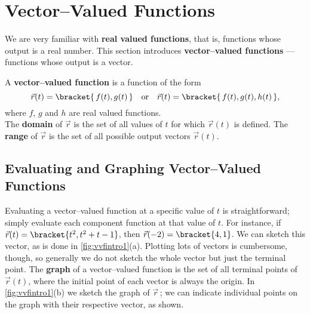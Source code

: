 \section{Vector--Valued Functions}\label{sec:vvf}


We are very familiar with \textbf{real valued functions}, that is, functions whose output is a real number. This section introduces \textbf{vector--valued functions} --- functions whose output is a vector. 

{A \textbf{vector--valued function} is a function of the form 
$$\vec r(t) =\bracket{\, f(t),g(t)\,}\quad \text{or}\quad \vec r(t) =\bracket{\,f(t),g(t),h(t)\,},$$
where $f$, $g$ and $h$ are real valued functions.\\

The \textbf{domain} of $\vec r$ is the set of all values of $t$ for which $\vec r(t)$ is defined. The \textbf{range} of $\vec r$ is the set of all possible output vectors $\vec r(t)$.
}

\subsection*{Evaluating and Graphing Vector--Valued Functions}

Evaluating a vector--valued function at a specific value of $t$ is straightforward; simply evaluate each component function at that value of $t$. For instance, if $\vec r(t) =\bracket{t^2,t^2+t-1}$, then $\vec r(-2) =\bracket{4,1}$. We can sketch this vector, as is done in \autoref{fig:vvfintro1}(a). Plotting lots of vectors is cumbersome, though, so generally we do not sketch the whole vector but just the terminal point. The \textbf{graph} of a vector--valued function is the set of all terminal points of $\vec r(t)$, where the initial point of each vector is always the origin. In \autoref{fig:vvfintro1}(b) we sketch the graph of $\vec r$\,; we can indicate individual points on the graph with their respective vector, as shown.

